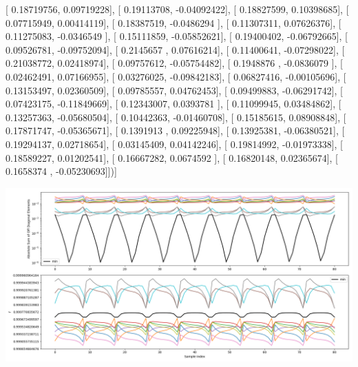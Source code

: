 \documentclass{article}
\begin{document}
       [ 0.18719756,  0.09719228],
       [ 0.19113708, -0.04092422],
       [ 0.18827599,  0.10398685],
       [ 0.07715949,  0.00414119],
       [ 0.18387519, -0.0486294 ],
       [ 0.11307311,  0.07626376],
       [ 0.11275083, -0.0346549 ],
       [ 0.15111859, -0.05852621],
       [ 0.19400402, -0.06792665],
       [ 0.09526781, -0.09752094],
       [ 0.2145657 ,  0.07616214],
       [ 0.11400641, -0.07298022],
       [ 0.21038772,  0.02418974],
       [ 0.09757612, -0.05754482],
       [ 0.1948876 , -0.0836079 ],
       [ 0.02462491,  0.07166955],
       [ 0.03276025, -0.09842183],
       [ 0.06827416, -0.00105696],
       [ 0.13153497,  0.02360509],
       [ 0.09785557,  0.04762453],
       [ 0.09499883, -0.06291742],
       [ 0.07423175, -0.11849669],
       [ 0.12343007,  0.0393781 ],
       [ 0.11099945,  0.03484862],
       [ 0.13257363, -0.05680504],
       [ 0.10442363, -0.01460708],
       [ 0.15185615,  0.08908848],
       [ 0.17871747, -0.05365671],
       [ 0.1391913 ,  0.09225948],
       [ 0.13925381, -0.06380521],
       [ 0.19294137,  0.02718654],
       [ 0.03145409,  0.04142246],
       [ 0.19814992, -0.01973338],
       [ 0.18589227,  0.01202541],
       [ 0.16667282,  0.0674592 ],
       [ 0.16820148,  0.02365674],
       [ 0.1658374 , -0.05230693]])]
\begin{center}
\includegraphics[scale=.9]{report_pickled_controls171/control_dpn_all.png}

\end{center}
\end{document}
